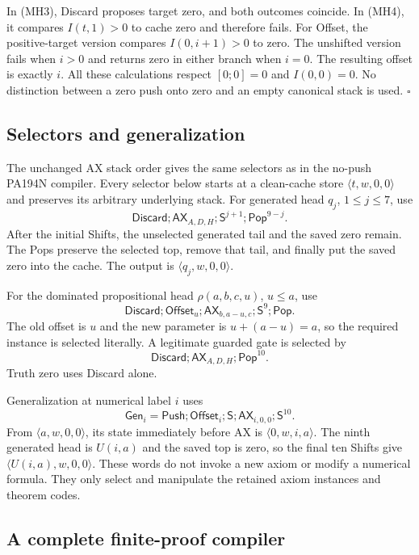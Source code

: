 In (MH3), Discard proposes target zero, and both outcomes coincide.
In (MH4), it compares $I(t,1)>0$ to cache zero and therefore fails.
For Offset, the positive-target version compares $I(0,i+1)>0$ to zero.
The unshifted version fails when $i>0$ and returns zero in either branch
when $i=0$. The resulting offset is exactly $i$. All these calculations
respect $[0;0]=0$ and $I(0,0)=0$. No distinction between a zero push onto
zero and an empty canonical stack is used. $\square$

\subsection{Selectors and generalization}

The unchanged AX stack order gives the same selectors as in the no-push
PA194N compiler. Every selector below starts at a clean-cache store
$\langle t,w,0,0\rangle$ and preserves its arbitrary underlying stack.
For generated head $q_j$, $1\le j\le7$, use
\[
 \mathsf{Discard};\mathsf{AX}_{A,D,H};
       \mathsf S^{j+1};\mathsf{Pop}^{9-j}.
 \tag{MH7}
\]
After the initial Shifts, the unselected generated tail and the saved
zero remain. The Pops preserve the selected top, remove that tail, and
finally put the saved zero into the cache. The output is
$\langle q_j,w,0,0\rangle$.

For the dominated propositional head $\rho(a,b,c,u)$, $u\le a$, use
\[
 \mathsf{Discard};\mathsf{Offset}_u;
   \mathsf{AX}_{b,a-u,c};\mathsf S^9;\mathsf{Pop}.
 \tag{MH8}
\]
The old offset is $u$ and the new parameter is
$u+(a-u)=a$, so the required instance is selected literally. A legitimate
guarded gate is selected by
\[
 \mathsf{Discard};\mathsf{AX}_{A,D,H};\mathsf{Pop}^{10}.
 \tag{MH9}
\]
Truth zero uses Discard alone.

Generalization at numerical label $i$ uses
\[
 \mathsf{Gen}_i=
 \mathsf{Push};\mathsf{Offset}_i;\mathsf S;
      \mathsf{AX}_{i,0,0};\mathsf S^{10}.
 \tag{MH10}
\]
From $\langle a,w,0,0\rangle$, its state immediately before AX is
$\langle0,w,i,a\rangle$. The ninth generated head is $U(i,a)$ and the
saved top is zero, so the final ten Shifts give
$\langle U(i,a),w,0,0\rangle$. These words do not invoke a new axiom or
modify a numerical formula. They only select and manipulate the retained
axiom instances and theorem codes.

\subsection{A complete finite-proof compiler}

